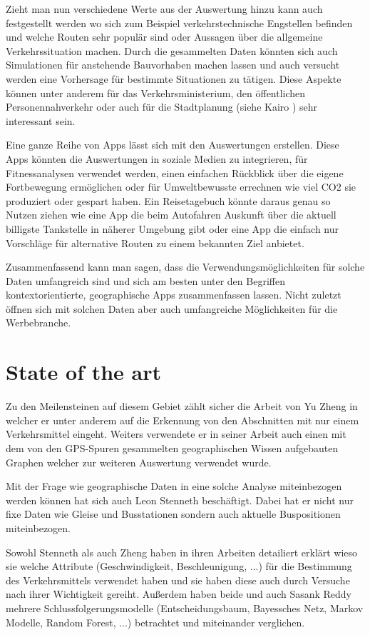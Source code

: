 Zieht man nun verschiedene Werte aus der Auswertung hinzu kann auch festgestellt werden wo sich zum Beispiel verkehrstechnische Engstellen befinden und welche Routen sehr populär sind oder Aussagen über die allgemeine Verkehrssituation machen. Durch die gesammelten Daten könnten sich auch Simulationen für anstehende Bauvorhaben machen lassen und auch versucht werden eine Vorhersage für bestimmte Situationen zu tätigen. Diese Aspekte können unter anderem für das Verkehrsministerium,  den öffentlichen Personennahverkehr oder auch für die Stadtplanung (siehe Kairo \cite{martin_gehlen_grosbau:_2015}) sehr interessant sein.

Eine ganze Reihe von Apps lässt sich mit den Auswertungen erstellen. Diese Apps könnten die Auswertungen in soziale Medien zu integrieren, für Fitnessanalysen verwendet werden, einen einfachen Rückblick über die eigene Fortbewegung ermöglichen oder für Umweltbewusste errechnen wie viel CO2 sie produziert oder gespart haben. Ein Reisetagebuch könnte daraus genau so Nutzen ziehen wie eine App die beim Autofahren Auskunft über die aktuell billigste Tankstelle in näherer Umgebung gibt oder eine App die einfach nur Vorschläge für alternative Routen zu einem bekannten Ziel anbietet.

Zusammenfassend kann man sagen, dass die Verwendungsmöglichkeiten für solche Daten umfangreich sind und sich am besten unter den Begriffen kontextorientierte, geographische Apps zusammenfassen lassen. Nicht zuletzt öffnen sich mit solchen Daten aber auch umfangreiche Möglichkeiten für die Werbebranche.

\section{State of the art}
Zu den Meilensteinen auf diesem Gebiet zählt sicher die Arbeit von Yu Zheng in welcher er unter anderem auf die Erkennung von den Abschnitten mit nur einem Verkehrsmittel eingeht. Weiters verwendete er in seiner Arbeit auch einen mit dem von den GPS-Spuren gesammelten geographischen Wissen aufgebauten Graphen welcher zur weiteren Auswertung verwendet wurde.\cite{zheng_understanding_2010}

Mit der Frage wie geographische Daten in eine solche Analyse miteinbezogen werden können hat sich auch  Leon Stenneth beschäftigt. Dabei hat er nicht nur fixe Daten wie Gleise und Busstationen sondern auch aktuelle Buspositionen miteinbezogen. \cite{stenneth_transportation_2011}

Sowohl Stenneth als auch Zheng haben in ihren Arbeiten detailiert erklärt wieso sie welche Attribute (Geschwindigkeit, Beschleunigung, ...) für die Bestimmung des Verkehrsmittels verwendet haben und sie haben diese auch durch Versuche nach ihrer Wichtigkeit gereiht. Außerdem haben beide und auch Sasank Reddy mehrere Schlussfolgerungsmodelle (Entscheidungsbaum, Bayessches Netz, Markov Modelle, Random Forest, ...) betrachtet und miteinander verglichen. \cite{reddy_using_2010, stenneth_transportation_2011, zheng_understanding_2010}

